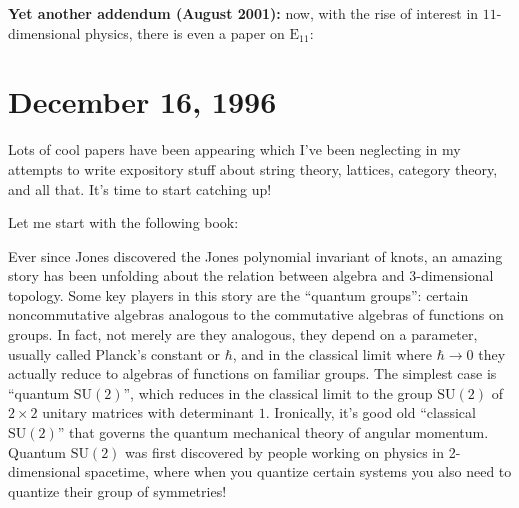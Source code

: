 \documentclass{article}
\def\tightlist{}
\renewcommand{\texttt}[1]{%
  \begingroup
  \ttfamily
  \begingroup\lccode`~=`/\lowercase{\endgroup\def~}{/\discretionary{}{}{}}%
  \begingroup\lccode`~=`[\lowercase{\endgroup\def~}{[\discretionary{}{}{}}%
  \begingroup\lccode`~=`.\lowercase{\endgroup\def~}{.\discretionary{}{}{}}%
  \catcode`/=\active\catcode`[=\active\catcode`.=\active
  \scantokens{#1\noexpand}%
  \endgroup
}
\begin{document}
\textbf{Yet another addendum (August 2001):} now, with the rise of
interest in \(11\)-dimensional physics, there is even a paper on
\(\mathrm{E}_{11}\):




\hypertarget{week96}{%
\section{December 16, 1996}\label{week96}}

Lots of cool papers have been appearing which I've been neglecting in my
attempts to write expository stuff about string theory, lattices,
category theory, and all that. It's time to start catching up!

Let me start with the following book:


Ever since Jones discovered the Jones polynomial invariant of knots, an
amazing story has been unfolding about the relation between algebra and
3-dimensional topology. Some key players in this story are the ``quantum
groups'': certain noncommutative algebras analogous to the commutative
algebras of functions on groups. In fact, not merely are they analogous,
they depend on a parameter, usually called Planck's constant or
\(\hbar\), and in the classical limit where \(\hbar\to0\) they actually
reduce to algebras of functions on familiar groups. The simplest case is
``quantum \(\mathrm{SU}(2)\)'', which reduces in the classical limit to
the group \(\mathrm{SU}(2)\) of \(2\times2\) unitary matrices with
determinant \(1\). Ironically, it's good old ``classical
\(\mathrm{SU}(2)\)'' that governs the quantum mechanical theory of
angular momentum. Quantum \(\mathrm{SU}(2)\) was first discovered by
people working on physics in 2-dimensional spacetime, where when you
quantize certain systems you also need to quantize their group of
symmetries!
\end{document}
